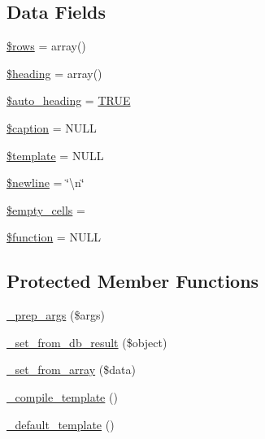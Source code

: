 \subsection*{Data Fields}
\begin{DoxyCompactItemize}
\item 
\mbox{\hyperlink{class_c_i___table_ace2ec39e7df3899fa8df9640ec274b03}{\$rows}} = array()
\item 
\mbox{\hyperlink{class_c_i___table_a196169be7715d466e3310388b096598c}{\$heading}} = array()
\item 
\mbox{\hyperlink{class_c_i___table_a394ea4ec17bcd63228039d7767bfb092}{\$auto\+\_\+heading}} = \mbox{\hyperlink{constants_8php_ae04a3efe6aa42044f803ee90c2277846}{T\+R\+UE}}
\item 
\mbox{\hyperlink{class_c_i___table_a4f9340ccb02c5d876a448a1d860f3812}{\$caption}} = N\+U\+LL
\item 
\mbox{\hyperlink{class_c_i___table_aa3e9534005fd516d941f6a5569896e01}{\$template}} = N\+U\+LL
\item 
\mbox{\hyperlink{class_c_i___table_a8735d5c31c4af1004825e6a28f236aeb}{\$newline}} = \char`\"{}\textbackslash{}n\char`\"{}
\item 
\mbox{\hyperlink{class_c_i___table_aeba996c863f9ba0e2c9e24d0491bb976}{\$empty\+\_\+cells}} = \textquotesingle{}\textquotesingle{}
\item 
\mbox{\hyperlink{class_c_i___table_af3e5d0d1ff43879d493dd97bb760c479}{\$function}} = N\+U\+LL
\end{DoxyCompactItemize}
\subsection*{Protected Member Functions}
\begin{DoxyCompactItemize}
\item 
\mbox{\hyperlink{class_c_i___table_aec91c20b757a8a063e4147f0aebe8b1b}{\+\_\+prep\+\_\+args}} (\$args)
\item 
\mbox{\hyperlink{class_c_i___table_a76d76f4f5ffe03c119b95164dcebf9ed}{\+\_\+set\+\_\+from\+\_\+db\+\_\+result}} (\$object)
\item 
\mbox{\hyperlink{class_c_i___table_a79c6ca8fd1f4e5b4bee157209e866a02}{\+\_\+set\+\_\+from\+\_\+array}} (\$data)
\item 
\mbox{\hyperlink{class_c_i___table_a7f408fd4eecadb5799d5ae004170c4d6}{\+\_\+compile\+\_\+template}} ()
\item 
\mbox{\hyperlink{class_c_i___table_ae1990fcb9ffc455614eeac9a1091f0b0}{\+\_\+default\+\_\+template}} ()
\end{DoxyCompactItemize}


